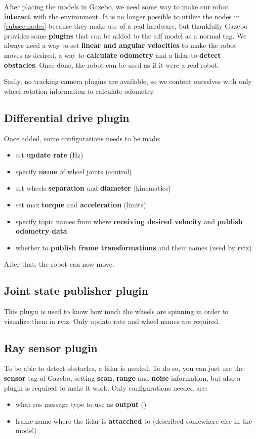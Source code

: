 After placing the models in Gazebo, we need some way to make our robot \textbf{interact} with the environment. It is no longer possible to utilize the nodes in \autoref{subsec:nodes} because they make use of a real hardware, but thankfully Gazebo provides some \textbf{plugins} that can be added to the \acrshort{sdf} model as a normal tag.
We always need a way to set \textbf{linear and angular velocities} to make the robot moves as desired, a way to \textbf{calculate odometry} and a lidar to \textbf{detect obstacles}. Once done, the robot can be used as if it were a real robot.

Sadly, no tracking camera plugins are available, so we content ourselves with only wheel rotation information to calculate odometry. 

\subsection{Differential drive plugin}

Once added, some configurations needs to be made:
\begin{itemize}
    \item set \textbf{update rate} (Hz)
    \item specify \textbf{name} of wheel joints (control)
    \item set wheels \textbf{separation} and \textbf{diameter} (kinematics)
    \item set max \textbf{torque} and \textbf{acceleration} (limits)
    \item specify topic names from where \textbf{receiving desired velocity} and \textbf{publish odometry data}
    \item whether to \textbf{publish frame transformations} and their names (used by \acrshort{rviz})
\end{itemize}
After that, the robot can now move.

\subsection{Joint state publisher plugin} %

This plugin is used to know how much the wheels are spinning in order to visualize them in \acrshort{rviz}. Only update rate and wheel names are required.

\subsection{Ray sensor plugin}

To be able to detect obstacles, a lidar is needed. To do so, you can just use the \textbf{sensor} tag  of Gazebo, setting \textbf{scan}, \textbf{range} and \textbf{noise} information, but also a plugin is required to make it work. Only configurations needed are:
\begin{itemize}
    \item what \acrshort{ros} message type to use as \textbf{output} ()
    \item frame name where the lidar is \textbf{attacched} to (described somewhere else in the model)
\end{itemize}